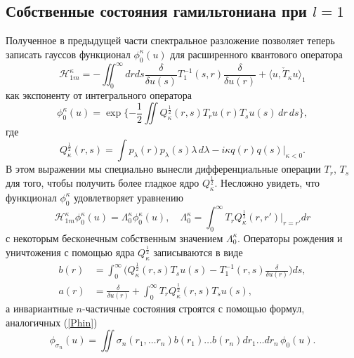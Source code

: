 \documentclass[12pt]{article}
\newcommand{\HH}{\mathscr{H}}
\begin{document}
\subsection{Собственные состояния гамильтониана при 
$ l=1 $}
    Полученное в предыдущей части
    спектральное разложение позволяет теперь записать гауссов функционал
$ \phi_{0}^{\kappa}(u) $
    для расширенного квантового оператора
\begin{equation*}
    \HH_{1m}^{\kappa} = -\iint_{0}^{\infty} dr ds
    \frac{\delta}{\delta u(s)} T_{1}^{-1}(s,r)
	\frac{\delta}{\delta u(r)}
	+ \langle u, \check{T}_{\kappa}u\rangle_{1}
\end{equation*}
    как экспоненту от интегрального оператора
\begin{equation*}
    \phi_{0}^{\kappa}(u)
	= \exp\{-\frac{1}{2} \iint Q_{\kappa}^{\frac{1}{2}}(r,s)
	T_{r}u(r) T_{s}u(s) \, dr\,ds\} ,
\end{equation*}
    где
\begin{equation*}
    Q_{\kappa}^{\frac{1}{2}}(r,s) = \int p_{\lambda}(r) p_{\lambda}(s)
	\lambda\,d\lambda - i\kappa q(r)q(s) \bigr|_{\kappa <0} .
\end{equation*}
    В этом выражении мы специально вынесли дифференциальные операции
$ T_{r} $, 
$ T_{s} $
    для того, чтобы получить более гладкое ядро
$ Q_{\kappa}^{\frac{1}{2}} $.
    Несложно увидеть, что функционал
$ \phi_{0}^{\kappa} $
    удовлетворяет уравнению
\begin{equation*}
    \HH_{1m}^{\kappa} \phi_{0}^{\kappa}(u)
	= \Lambda_{0}^{\kappa} \phi_{0}^{\kappa}(u) ,\quad
    \Lambda_{0}^{\kappa} = \int_{0}^{\infty} T_{r}
	Q_{\kappa}^{\frac{1}{2}}(r,r') |_{r=r'} dr
\end{equation*}
    с некоторым бесконечным собственным значением
$ \Lambda_{0}^{\kappa} $.
    Операторы рождения и уничтожения с помощью ядра
$ Q_{\kappa}^{\frac{1}{2}} $
    записываются в виде
\begin{align*}
    b(r) &= \int_{0}^{\infty} \bigl( Q_{\kappa}^{\frac{1}{2}}(r,s)T_{s}u(s)
	- T_{1}^{-1}(r,s) \frac{\delta}{\delta u(r)} \bigr) ds , \\
    a(r) &= \frac{\delta}{\delta u(r)} + \int_{0}^{\infty} 
	T_{r} Q_{\kappa}^{\frac{1}{2}}(r,s) T_{s} u(s) ,
\end{align*}
    а инвариантные
$ n $-частичные состояния строятся с помощью формул, аналогичных
(\ref{Phin})
\begin{equation*}
    \phi_{\sigma_{n}}(u) = \iint
    \sigma_{n} (r_{1},\ldots r_{n})
	b(r_{1}) \ldots b(r_{n})
    dr_{1} \ldots dr_{n} \, \phi_{0}(u) .
\end{equation*}
\end{document}
